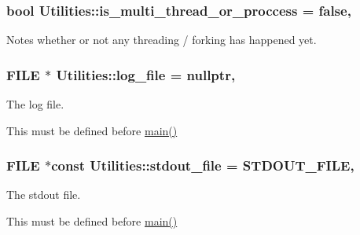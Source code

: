 \subsubsection[{\texorpdfstring{is\+\_\+multi\+\_\+thread\+\_\+or\+\_\+proccess}{is_multi_thread_or_proccess}}]{\setlength{\rightskip}{0pt plus 5cm}bool Utilities\+::is\+\_\+multi\+\_\+thread\+\_\+or\+\_\+proccess = false\hspace{0.3cm}{\ttfamily [static]}, {\ttfamily [private]}}\hypertarget{class_utilities_af893d8dcd5bb1ba3fc72fc108536bcbc}{}\label{class_utilities_af893d8dcd5bb1ba3fc72fc108536bcbc}


Notes whether or not any threading / forking has happened yet. 

\subsubsection[{\texorpdfstring{log\+\_\+file}{log_file}}]{\setlength{\rightskip}{0pt plus 5cm}F\+I\+LE $\ast$ Utilities\+::log\+\_\+file = nullptr\hspace{0.3cm}{\ttfamily [static]}, {\ttfamily [private]}}\hypertarget{class_utilities_a63ce9d08b6459cd102bb368a274aca07}{}\label{class_utilities_a63ce9d08b6459cd102bb368a274aca07}


The log file. 

This must be defined before \hyperlink{shadow__stack_8cpp_a0ddf1224851353fc92bfbff6f499fa97}{main()} 
\subsubsection[{\texorpdfstring{stdout\+\_\+file}{stdout_file}}]{\setlength{\rightskip}{0pt plus 5cm}F\+I\+LE $\ast$const Utilities\+::stdout\+\_\+file = {\bf S\+T\+D\+O\+U\+T\+\_\+\+F\+I\+LE}\hspace{0.3cm}{\ttfamily [static]}, {\ttfamily [private]}}\hypertarget{class_utilities_a224eea0a234ac9877a8334f74fc89ef0}{}\label{class_utilities_a224eea0a234ac9877a8334f74fc89ef0}


The stdout file. 

This must be defined before \hyperlink{shadow__stack_8cpp_a0ddf1224851353fc92bfbff6f499fa97}{main()} 
